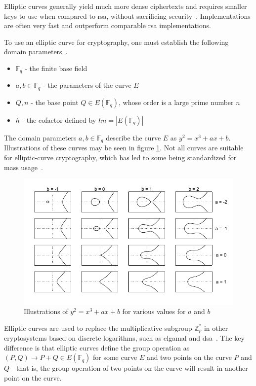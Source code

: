 Elliptic curves generally yield much more dense ciphertexts and requires smaller keys to use when compared to \gls{rsa}, without sacrificing security~\cite{delfs2007}. Implementations are often very fast and outperform comparable \gls{rsa} implementations.

To use an elliptic curve for cryptography, one must establish the following domain parameters~\cite{delfs2007}.

\begin{itemize}
    \item $\mathbb{F}_q$ - the finite base field
    \item $a,b\in\mathbb{F}_q$ - the parameters of the curve $E$
    \item $Q,n$ - the base point $Q\in E(\mathbb{F}_q)$, whose order is a large prime number $n$
    \item $h$ - the cofactor defined by $hn=|E(\mathbb{F}_q)|$
\end{itemize}

\noindent The domain parameters $a,b\in\mathbb{F}_q$ describe the curve $E$ as $y^2=x^3+ax+b$. Illustrations of these curves may be seen in figure \ref{figure:background:elliptic-curves}. Not all curves are suitable for elliptic-curve cryptography, which has led to some being standardized for mass usage~\cite{nist2018}.

\begin{figure}[t]
    \centering
    \includegraphics{chapters/background/figures/elliptic-curves.pdf}
    \caption{Illustrations of $y^2=x^3+ax+b$ for various values for $a$ and $b$}
    \label{figure:background:elliptic-curves}
\end{figure}

Elliptic curves are used to replace the multiplicative subgroup $\mathbb{Z}_p^*$ in other cryptosystems based on discrete logarithms, such as \gls{elgamal} and \gls{dsa}~\cite{delfs2007}. The key difference is that elliptic curves define the group operation as $(P, Q)\to P+Q\in E(\mathbb{F}_q)$ for some curve $E$ and two points on the curve $P$ and $Q$ - that is, the group operation of two points on the curve will result in another point on the curve.

